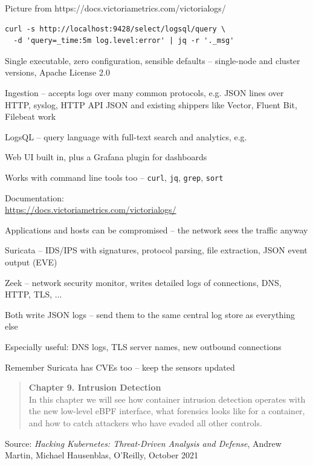 \documentclass[Screen16to9,17pt]{foils}
\begin{document}
Picture from https://docs.victoriametrics.com/victorialogs/



\begin{verbatim}
curl -s http://localhost:9428/select/logsql/query \
  -d 'query=_time:5m log.level:error' | jq -r '._msg'
\end{verbatim}

\begin{list2}
\item Single executable, zero configuration, sensible defaults --
  single-node and cluster versions, Apache License 2.0
\item Ingestion -- accepts logs over many common protocols, e.g.
  JSON lines over HTTP, syslog,
  HTTP API JSON and existing shippers like Vector, Fluent Bit, Filebeat work
\item LogsQL -- query language with full-text search and analytics, e.g.
\item Web UI built in, plus a Grafana plugin for dashboards
\item Works with command line tools too -- \verb+curl+, \verb+jq+, \verb+grep+, \verb+sort+
\end{list2}

Documentation:\\
\url{https://docs.victoriametrics.com/victorialogs/}



\begin{list2}
\item Applications and hosts can be compromised -- the network sees the traffic anyway
\item Suricata -- IDS/IPS with signatures, protocol parsing, file extraction,
JSON event output (EVE) \link{https://suricata.io/}
\item Zeek -- network security monitor, writes detailed logs of connections,
DNS, HTTP, TLS, ... \link{https://zeek.org/}
\item Both write JSON logs -- send them to the same central log store as everything else
\item Especially useful: DNS logs, TLS server names, new outbound connections
\item Remember Suricata has CVEs too -- keep the sensors updated
\end{list2}



\begin{quote}
{\bf Chapter 9. Intrusion Detection}\\
In this chapter we will see how container intrusion detection operates with the new low-level eBPF interface, what forensics looks like for a container, and how to catch attackers who have evaded all other controls.
\end{quote}
Source: \emph{Hacking Kubernetes: Threat-Driven Analysis and Defense}, Andrew Martin, Michael Hausenblas, O'Reilly, October 2021
\end{document}
